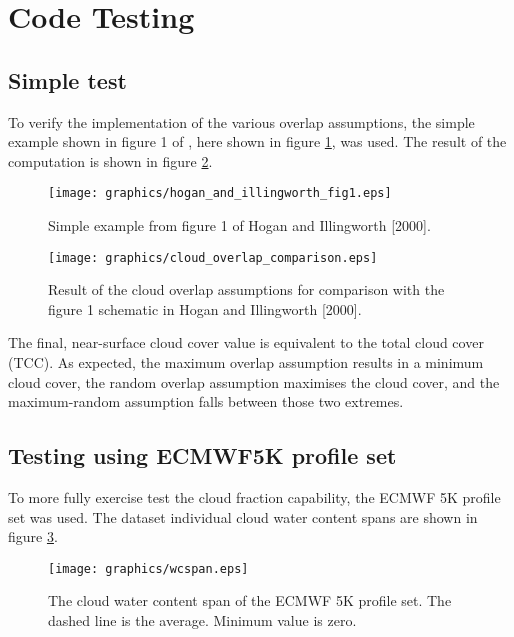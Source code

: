 \section{Code Testing}
\label{sec:code_testing}


\subsection{Simple test}

To verify the implementation of the various overlap assumptions, the simple example shown in figure 1 of \citet{HoganIllingworth_2000}, here shown in figure \ref{fig:cloud_overlap_example}, was used. The result of the computation is shown in figure \ref{fig:cloud_overlap_comparison}.

\begin{figure}[H]
  \caption{Simple example from figure 1 of Hogan and Illingworth [2000].}
  \label{fig:cloud_overlap_example}
  \centering
  \texttt{[image: graphics/hogan\_and\_illingworth\_fig1.eps]}
\end{figure}

\begin{figure}[H]
  \caption{Result of the cloud overlap assumptions for comparison with the figure 1 schematic in Hogan and Illingworth [2000].}
  \label{fig:cloud_overlap_comparison}
  \centering
  \texttt{[image: graphics/cloud\_overlap\_comparison.eps]}
\end{figure}

The final, near-surface cloud cover value is equivalent to the total cloud cover (TCC). As expected, the maximum overlap assumption results in a minimum cloud cover, the random overlap assumption maximises the cloud cover, and the maximum-random assumption falls between those two extremes. 


\subsection{Testing using ECMWF5K profile set}

To more fully exercise test the cloud fraction capability, the ECMWF 5K profile set \citep{ECMWF5K_profile_set} was used. The dataset individual cloud water content spans are shown in figure \ref{fig:ECMWF5K.wcspan}.

\begin{figure}[htp]
  \caption{The cloud water content span of the ECMWF 5K profile set. The dashed line is the average. Minimum value is zero.}
  \label{fig:ECMWF5K.wcspan}
  \centering
  \texttt{[image: graphics/wcspan.eps]}
\end{figure}

